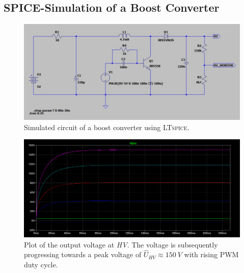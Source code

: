     \subsection*{SPICE-Simulation of a Boost Converter}
    \begin{figure}[h]
        \centering
        \includegraphics[width=\textwidth]{Spice/circuit.jpg}
        \caption[Simulated circuit of a boost converter.]{Simulated circuit of a boost converter using \textsc{LTspice}.}
        \label{fig:simCircuit}
    \end{figure}
    \begin{figure}[h]
        \centering\includegraphics[width=\textwidth]{Spice/plot.jpg}
        \caption{Plot of the output voltage at \textit{HV}. The voltage is subsequently progressing towards a peak voltage of \( \hat{U}_{HV} \approx \SI[]{150}[]{V} \) with rising PWM duty cycle.}
        \label{fig:plotSimCircuit}
    \end{figure}
